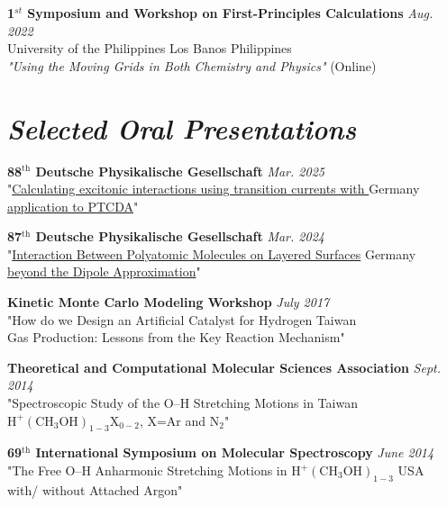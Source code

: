 {\bf 1$^{st}$ Symposium and Workshop on First-Principles Calculations} \hfill \textit{Aug. 2022} \\
University of the Philippines Los Banos \hfill Philippines \\
\emph{"Using the Moving Grids in Both Chemistry and Physics"}  \hfill (Online) 

\section{\sl Selected Oral Presentations}

{\bf 88${^\text{th}}$ Deutsche Physikalische Gesellschaft}
\hfill \textit{Mar. 2025} \\
"\href{https://www.dpg-verhandlungen.de/year/2025/conference/bonn/part/mo/session/30/contribution/7}{Calculating excitonic interactions using transition currents with }
\hfill Germany \\
\href{https://www.dpg-verhandlungen.de/year/2025/conference/bonn/part/mo/session/30/contribution/7}{application to PTCDA}"

{\bf 87${^\text{th}}$ Deutsche Physikalische Gesellschaft} \hfill \textit{Mar. 2024} \\
"\href{https://www.dpg-verhandlungen.de/year/2024/conference/berlin/part/o/session/15/contribution/3}{Interaction Between Polyatomic Molecules on Layered Surfaces}
\hfill Germany \\
\href{https://www.dpg-verhandlungen.de/year/2024/conference/berlin/part/o/session/15/contribution/3}{beyond the Dipole Approximation}"

{\bf Kinetic Monte Carlo Modeling Workshop}
\hfill \textit{July 2017}\\
"How do we Design an Artificial Catalyst for Hydrogen \hfill Taiwan \\
Gas Production: Lessons from the Key Reaction Mechanism"

{\bf Theoretical and Computational Molecular Sciences Association}
\hfill \textit{Sept. 2014}\\
"Spectroscopic Study of the O--H Stretching Motions in \hfill Taiwan \\
$\mathrm{H^+(CH_3OH)_{1-3}X_{0-2}}$,
X=Ar and N$_2$"

{\bf  69$^{\text{th}}$ International Symposium on Molecular Spectroscopy}
\hfill \textit{June 2014}\\
"The Free O--H Anharmonic Stretching Motions in $\mathrm{H^+(CH_3OH)_{1-3}}$ \hfill USA \\
with/ without Attached Argon"

